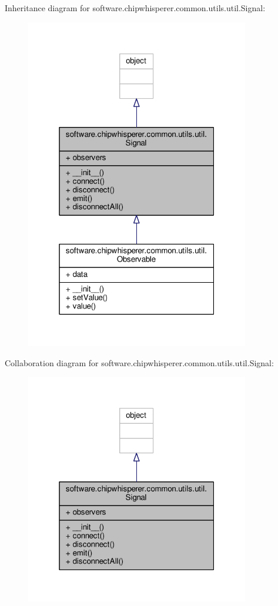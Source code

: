 Inheritance diagram for software.\+chipwhisperer.\+common.\+utils.\+util.\+Signal\+:\nopagebreak
\begin{figure}[H]
\begin{center}
\leavevmode
\includegraphics[width=277pt]{da/d3c/classsoftware_1_1chipwhisperer_1_1common_1_1utils_1_1util_1_1Signal__inherit__graph}
\end{center}
\end{figure}


Collaboration diagram for software.\+chipwhisperer.\+common.\+utils.\+util.\+Signal\+:\nopagebreak
\begin{figure}[H]
\begin{center}
\leavevmode
\includegraphics[width=277pt]{dc/d42/classsoftware_1_1chipwhisperer_1_1common_1_1utils_1_1util_1_1Signal__coll__graph}
\end{center}
\end{figure}


